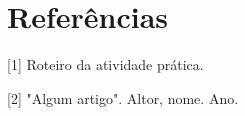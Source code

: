 \newpage
\section{Referências}

[1] Roteiro da atividade prática.
\vspace{0.5cm}

[2] "Algum artigo". Altor, nome. Ano.
\vspace{0.5cm}